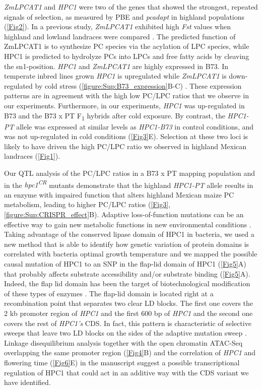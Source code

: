 \documentclass[9pt,twocolumn,twoside,lineno]{biorxiv}
\newcommand{\hpc}{\textit{HPC1}\xspace}
\begin{document}
\textit{ZmLPCAT1} and \hpc were two of the genes that showed the strongest, repeated signals of selection, as measured by PBE and \textit{pcadapt} in highland populations (\cref{Fig2}). 
In a previous study, \textit{ZmLPCAT1} exhibited high \textit{Fst} values when highland and lowland landraces were compared \cite{Takuno2015-uj}.
The predicted function of ZmLPCAT1 is to synthesize PC species via the acylation of LPC species, while HPC1 is predicted to hydrolyze PCs into LPCs and free fatty acids by cleaving the sn1-position.
\hpc and \textit{ZmLPCAT1} are highly expressed in B73. 
In temperate inbred lines grown \hpc is upregulated while \textit{ZmLPCAT1} is down-regulated by cold stress (\cref{figure:Sup:B73_expression}B-C) \cite{Waters2017-nat}.
These expression patterns are in agreement with the high low PC/LPC ratios that we observe in our experiments. 
Furthermore, in our experiments, \hpc was up-regulated in B73 and the B73 x PT F\textsubscript{1} hybrids after cold exposure. By contrast, the \textit{HPC1-PT} allele was expressed at similar levels as \textit{HPC1-B73} in control conditions, and was not up-regulated in cold conditions (\cref{Fig3}E).
Selection at these two loci is likely to have driven the high PC/LPC ratio we observed in highland Mexican landraces (\cref{Fig1}). 

Our QTL analysis of the PC/LPC ratios in a B73 x PT mapping population and in the \textit{hpc1\textsuperscript{CR}} mutants demonstrate that the highland \textit{HPC1-PT} allele results in an enzyme with impaired function that alters highland Mexican maize PC metabolism, leading to higher PC/LPC ratios (\cref{Fig3}, \cref{figure:Sup:CRISPR_effect}B). 
Adaptive loss-of-function mutations can be an effective way to gain new metabolic functions in new environmental conditions \cite{Hottes2013-np}.
Taking advantage of the conserved lipase domain of HPC1 in bacteria, we used a new method that is able to identify how genetic variation of protein domains is correlated with bacteria optimal growth temperature \cite{Jensen2021-iv, Jensen2021-zm} and we mapped the possible causal mutation of HPC1 to an SNP in the flap-lid domain of HPC1 (\cref{Fig5}A) that probably affects substrate  accessibility and/or substrate binding (\cref{Fig5}A). 
Indeed, the flap lid domain has been the target of biotechnological modification of these types of enzymes \cite{Khan2017-ua}.
The flap-lid domain is located right at a recombination point that separates two clear LD blocks. 
The first one covers the 2 kb promoter region of \hpc and the first 600 bp of \hpc and the second one covers the rest of \textit{HPC1's} CDS. 
In fact, this pattern is characteristic of selective sweeps that leave two LD blocks on the sides of the adaptive mutation sweep \cite{Kim2004-pa}. 
Linkage disequilibrium analysis together with the open chromatin ATAC-Seq overlapping the same promoter region (\cref{Fig4}B) and the correlation of \hpc and flowering time (\cref{Fig6}E) in the manuscript suggest a possible transcriptional regulation of HPC1 that could act in an additive way with the CDS variant we have identified.   
\end{document}
